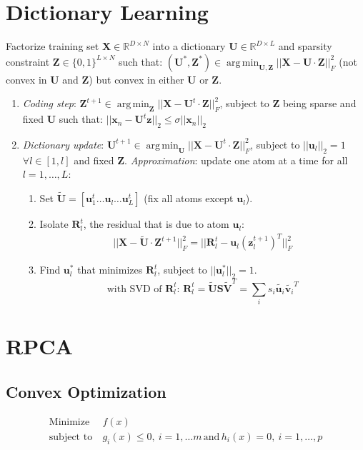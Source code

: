 \documentclass[a4paper,11pt,landscape]{article}
\newcommand{\argmin}{\operatorname*{arg\,min}}
\newcommand{\R}{\mathbb{R}}
\newcommand{\sectionline}{\noindent\makebox[\linewidth]{\rule{\columnwidth}{0.1pt}}}
\newcommand{\msection}[1]{\vspace{-1mm}\sectionline\vspace{-1mm}\section{#1}\vspace{-1mm}}
\begin{document}
\begin{multicols}{3}
\section{Dictionary Learning}
Factorize training set $\mathbf X \in \R^{D\times N}$ into a dictionary $\mathbf U \in \R^{D\times L}$ and sparsity constraint $\mathbf Z \in \{0,1\}^{L\times N}$ such that: $(\mathbf U^*, \mathbf Z^*) \in \argmin_{\mathbf U, \mathbf Z} ||\mathbf X - \mathbf U\cdot \mathbf Z||_F^2$ (not convex in $\mathbf U$ and $\mathbf Z$) but convex in either $\mathbf U$ or $\mathbf Z$.
\begin{enumerate}
 \item \emph{Coding step}: $\mathbf Z^{t+1} \in \argmin_{\mathbf Z} || \mathbf X - \mathbf U^t \cdot \mathbf Z||_F^2$, subject to $\mathbf Z$ being sparse and fixed $\mathbf U$ 
 such that: $|| \mathbf x_n - \mathbf U^t \mathbf z||_2 \leq \sigma ||\mathbf x_n||_2$
 \item \emph{Dictionary update}: $\mathbf U^{t+1} \in \argmin_{\mathbf U} ||\mathbf X - \mathbf U^t \cdot \mathbf Z||_F^2$, subject to  $||\mathbf u_l||_2=1$ $\forall l \in [1,l]$ and fixed $\mathbf Z$. \emph{Approximation}:  update one atom at a time for all $l = 1,\ldots,L$:
 \begin{enumerate}
  \item Set $\tilde{\mathbf U} = [\mathbf u_1^t \ldots \mathbf u_l \ldots \mathbf u_L^t]$ (fix all atoms except $\mathbf u_l$).
  \item Isolate $\mathbf R_l^t$, the residual that is due to atom $\mathbf u_l$:
   \begin{align*}
    || \mathbf X - \tilde{\mathbf U} \cdot \mathbf Z^{t+1} ||_F^2 
    = || \mathbf R_l^t - \mathbf u_l ( \mathbf z_l^{t+1})^T||_F^2
   \end{align*}

  \item Find $\mathbf u_l^*$ that minimizes $\mathbf R_l^t$, subject to $||\mathbf u_l^*||_2 = 1$.
  \[
\text{with SVD of $\mathbf R_l^t$: }
\mathbf R_l^t = \tilde{\mathbf U} \mathbf S \tilde{\mathbf V}^T = \sum_i s_i \tilde{\mathbf u_i}\tilde{\mathbf v_i}^T
  \]
 \end{enumerate}

\end{enumerate}


\msection{RPCA}
\subsection{Convex Optimization}
\begin{align*}
 \text{Minimize}\ &f(x)\\
 \text{subject to}\ & g_i(x) \leq 0,\ i=1,\ldots m\, \text{and}\, h_i(x)=0,\ i=1,\ldots,p
\end{align*}

\end{multicols}
\end{document}
